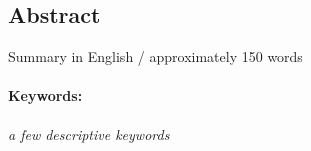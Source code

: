 \subsection*{Abstract}
Summary in English / approximately 150 words

\paragraph{Keywords:}
\textit{a few descriptive keywords}
